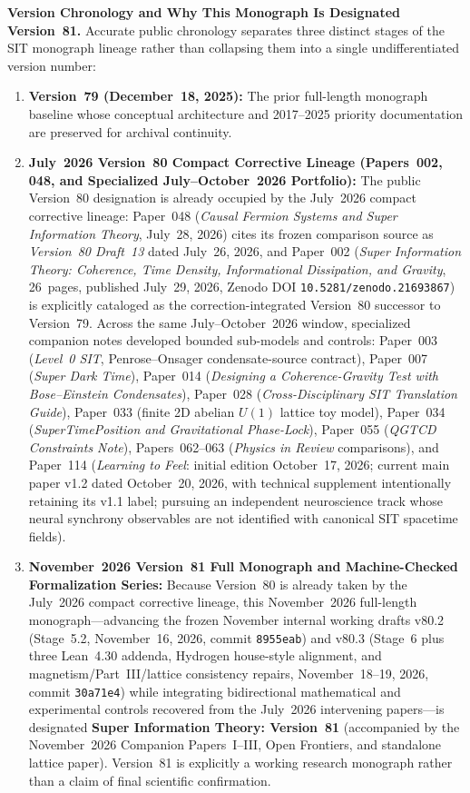 \textbf{Version Chronology and Why This Monograph Is Designated Version~81.} Accurate public chronology separates three distinct stages of the SIT monograph lineage rather than collapsing them into a single undifferentiated version number:
\begin{enumerate}[leftmargin=2em]
  \item \textbf{Version~79 (December~18, 2025):} The prior full-length monograph baseline whose conceptual architecture and 2017--2025 priority documentation are preserved for archival continuity.
  \item \textbf{July~2026 Version~80 Compact Corrective Lineage (Papers~002, 048, and Specialized July--October~2026 Portfolio):} The public Version~80 designation is already occupied by the July~2026 compact corrective lineage: Paper~048 (\emph{Causal Fermion Systems and Super Information Theory}, July~28, 2026) cites its frozen comparison source as \emph{Version~80 Draft~13} dated July~26, 2026, and Paper~002 (\emph{Super Information Theory: Coherence, Time Density, Informational Dissipation, and Gravity}, 26~pages, published July~29, 2026, Zenodo DOI \texttt{10.5281/zenodo.21693867}) is explicitly cataloged as the correction-integrated Version~80 successor to Version~79. Across the same July--October~2026 window, specialized companion notes developed bounded sub-models and controls: Paper~003 (\emph{Level~0 SIT}, Penrose--Onsager condensate-source contract), Paper~007 (\emph{Super Dark Time}), Paper~014 (\emph{Designing a Coherence-Gravity Test with Bose--Einstein Condensates}), Paper~028 (\emph{Cross-Disciplinary SIT Translation Guide}), Paper~033 (finite 2D abelian $U(1)$ lattice toy model), Paper~034 (\emph{SuperTimePosition and Gravitational Phase-Lock}), Paper~055 (\emph{QGTCD Constraints Note}), Papers~062--063 (\emph{Physics in Review} comparisons), and Paper~114 (\emph{Learning to Feel}: initial edition October~17, 2026; current main paper v1.2 dated October~20, 2026, with technical supplement intentionally retaining its v1.1 label; pursuing an independent neuroscience track whose neural synchrony observables are not identified with canonical SIT spacetime fields).
  \item \textbf{November~2026 Version~81 Full Monograph and Machine-Checked Formalization Series:} Because Version~80 is already taken by the July~2026 compact corrective lineage, this November~2026 full-length monograph---advancing the frozen November internal working drafts v80.2 (Stage~5.2, November~16, 2026, commit \texttt{8955eab}) and v80.3 (Stage~6 plus three Lean~4.30 addenda, Hydrogen house-style alignment, and magnetism/Part~III/lattice consistency repairs, November~18--19, 2026, commit \texttt{30a71e4}) while integrating bidirectional mathematical and experimental controls recovered from the July~2026 intervening papers---is designated \textbf{Super Information Theory: Version~81} (accompanied by the November~2026 Companion Papers~I--III, Open Frontiers, and standalone lattice paper). Version~81 is explicitly a working research monograph rather than a claim of final scientific confirmation.
\end{enumerate}

